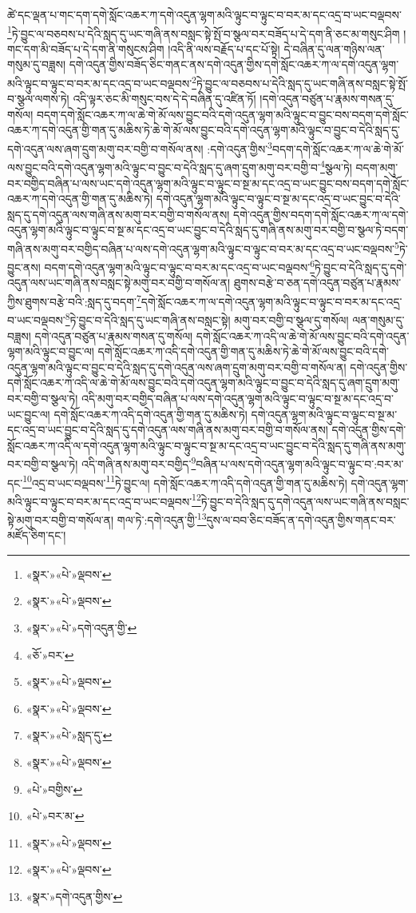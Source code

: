 ཚེ་དང་ལྡན་པ་གང་དག་དགེ་སློང་འཆར་ཀ་དགེ་འདུན་ལྷག་མའི་ལྟུང་བ་ལྟུང་བ་བར་མ་དང་འདྲ་བ་ཡང་བལྡབས་\footnote{«སྣར་»«པེ་»ལྡབས་}ཏེ་བྱུང་ལ་བཅབས་པ་དེའི་སླད་དུ་ཡང་གཞི་ནས་བསླང་སྟེ་སྤོ་བ་སྩལ་བར་བཟོད་པ་དེ་དག་ནི་ཅང་མ་གསུང་ཤིག །གང་དག་མི་བཟོད་པ་དེ་དག་ནི་གསུངས་ཤིག །འདི་ནི་ལས་བརྗོད་པ་དང་པོ་སྟེ། དེ་བཞིན་དུ་ལན་གཉིས་ལན་གསུམ་དུ་བཟླས། དགེ་འདུན་གྱིས་བཟོད་ཅིང་གནང་ནས་དགེ་འདུན་གྱིས་དགེ་སློང་འཆར་ཀ་ལ་དགེ་འདུན་ལྷག་མའི་ལྟུང་བ་ལྟུང་བ་བར་མ་དང་འདྲ་བ་ཡང་བལྡབས་\footnote{«སྣར་»«པེ་»ལྡབས་}ཏེ་བྱུང་ལ་བཅབས་པ་དེའི་སླད་དུ་ཡང་གཞི་ནས་བསླང་སྟེ་སྤོ་བ་སྩལ་ལགས་ཏེ། འདི་ལྟར་ཅང་མི་གསུང་བས་དེ་དེ་བཞིན་དུ་འཛིན་ཏོ། །དགེ་འདུན་བཙུན་པ་རྣམས་གསན་དུ་གསོལ། བདག་དགེ་སློང་འཆར་ཀ་ལ་ཆེ་གེ་མོ་ལས་བྱུང་བའི་དགེ་འདུན་ལྷག་མའི་ལྟུང་བ་བྱུང་བས་བདག་དགེ་སློང་འཆར་ཀ་དགེ་འདུན་གྱི་གན་དུ་མཆིས་ཏེ་ཆེ་གེ་མོ་ལས་བྱུང་བའི་དགེ་འདུན་ལྷག་མའི་ལྟུང་བ་བྱུང་བ་དེའི་སླད་དུ་དགེ་འདུན་ལས་ཞག་དྲུག་མགུ་བར་བགྱི་བ་གསོལ་ནས། :དགེ་འདུན་གྱིས་\footnote{«སྣར་»«པེ་»དགེ་འདུན་གྱི་}བདག་དགེ་སློང་འཆར་ཀ་ལ་ཆེ་གེ་མོ་ལས་བྱུང་བའི་དགེ་འདུན་ལྷག་མའི་ལྟུང་བ་བྱུང་བ་དེའི་སླད་དུ་ཞག་དྲུག་མགུ་བར་བགྱི་བ་\footnote{«ཅོ་»བར་}སྩལ་ཏེ། བདག་མགུ་བར་བགྱིད་བཞིན་པ་ལས་ཡང་དགེ་འདུན་ལྷག་མའི་ལྟུང་བ་ལྟུང་བ་སྔ་མ་དང་འདྲ་བ་ཡང་བྱུང་བས་བདག་དགེ་སློང་འཆར་ཀ་དགེ་འདུན་གྱི་གན་དུ་མཆིས་ཏེ། དགེ་འདུན་ལྷག་མའི་ལྟུང་བ་ལྟུང་བ་སྔ་མ་དང་འདྲ་བ་ཡང་བྱུང་བ་དེའི་སླད་དུ་དགེ་འདུན་ལས་གཞི་ནས་མགུ་བར་བགྱི་བ་གསོལ་ནས། དགེ་འདུན་གྱིས་བདག་དགེ་སློང་འཆར་ཀ་ལ་དགེ་འདུན་ལྷག་མའི་ལྟུང་བ་ལྟུང་བ་སྔ་མ་དང་འདྲ་བ་ཡང་བྱུང་བ་དེའི་སླད་དུ་གཞི་ནས་མགུ་བར་བགྱི་བ་སྩལ་ཏེ་བདག་གཞི་ནས་མགུ་བར་བགྱིད་བཞིན་པ་ལས་དགེ་འདུན་ལྷག་མའི་ལྟུང་བ་ལྟུང་བ་བར་མ་དང་འདྲ་བ་ཡང་བལྡབས་\footnote{«སྣར་»«པེ་»ལྡབས་}ཏེ་བྱུང་ནས། བདག་དགེ་འདུན་ལྷག་མའི་ལྟུང་བ་ལྟུང་བ་བར་མ་དང་འདྲ་བ་ཡང་བལྡབས་\footnote{«སྣར་»«པེ་»ལྡབས་}ཏེ་བྱུང་བ་དེའི་སླད་དུ་དགེ་འདུན་ལས་ཡང་གཞི་ནས་བསླང་སྟེ་མགུ་བར་བགྱི་བ་གསོལ་ན། ཐུགས་བརྩེ་བ་ཅན་དགེ་འདུན་བཙུན་པ་རྣམས་ཀྱིས་ཐུགས་བརྩེ་བའི་:སླད་དུ་བདག་\footnote{«སྣར་»«པེ་»སླད་དུ་}དགེ་སློང་འཆར་ཀ་ལ་དགེ་འདུན་ལྷག་མའི་ལྟུང་བ་ལྟུང་བ་བར་མ་དང་འདྲ་བ་ཡང་བལྡབས་\footnote{«སྣར་»«པེ་»ལྡབས་}ཏེ་བྱུང་བ་དེའི་སླད་དུ་ཡང་གཞི་ནས་བསླང་སྟེ། མགུ་བར་བགྱི་བ་སྩལ་དུ་གསོལ། ལན་གསུམ་དུ་བཟླས། དགེ་འདུན་བཙུན་པ་རྣམས་གསན་དུ་གསོལ། དགེ་སློང་འཆར་ཀ་འདི་ལ་ཆེ་གེ་མོ་ལས་བྱུང་བའི་དགེ་འདུན་ལྷག་མའི་ལྟུང་བ་བྱུང་ལ། དགེ་སློང་འཆར་ཀ་འདི་དགེ་འདུན་གྱི་གན་དུ་མཆིས་ཏེ་ཆེ་གེ་མོ་ལས་བྱུང་བའི་དགེ་འདུན་ལྷག་མའི་ལྟུང་བ་བྱུང་བ་དེའི་སླད་དུ་དགེ་འདུན་ལས་ཞག་དྲུག་མགུ་བར་བགྱི་བ་གསོལ་ན། དགེ་འདུན་གྱིས་དགེ་སློང་འཆར་ཀ་འདི་ལ་ཆེ་གེ་མོ་ལས་བྱུང་བའི་དགེ་འདུན་ལྷག་མའི་ལྟུང་བ་བྱུང་བ་དེའི་སླད་དུ་ཞག་དྲུག་མགུ་བར་བགྱི་བ་སྩལ་ཏེ། འདི་མགུ་བར་བགྱིད་བཞིན་པ་ལས་དགེ་འདུན་ལྷག་མའི་ལྟུང་བ་ལྟུང་བ་སྔ་མ་དང་འདྲ་བ་ཡང་བྱུང་ལ། དགེ་སློང་འཆར་ཀ་འདི་དགེ་འདུན་གྱི་གན་དུ་མཆིས་ཏེ། དགེ་འདུན་ལྷག་མའི་ལྟུང་བ་ལྟུང་བ་སྔ་མ་དང་འདྲ་བ་ཡང་བྱུང་བ་དེའི་སླད་དུ་དགེ་འདུན་ལས་གཞི་ནས་མགུ་བར་བགྱི་བ་གསོལ་ནས། དགེ་འདུན་གྱིས་དགེ་སློང་འཆར་ཀ་འདི་ལ་དགེ་འདུན་ལྷག་མའི་ལྟུང་བ་ལྟུང་བ་སྔ་མ་དང་འདྲ་བ་ཡང་བྱུང་བ་དེའི་སླད་དུ་གཞི་ནས་མགུ་བར་བགྱི་བ་སྩལ་ཏེ། འདི་གཞི་ནས་མགུ་བར་བགྱིད་\footnote{«པེ་»བགྱིས་}བཞིན་པ་ལས་དགེ་འདུན་ལྷག་མའི་ལྟུང་བ་ལྟུང་བ་:བར་མ་དང་\footnote{«པེ་»བར་མ་}འདྲ་བ་ཡང་བལྡབས་\footnote{«སྣར་»«པེ་»ལྡབས་}ཏེ་བྱུང་ལ། དགེ་སློང་འཆར་ཀ་འདི་དགེ་འདུན་གྱི་གན་དུ་མཆིས་ཏེ། དགེ་འདུན་ལྷག་མའི་ལྟུང་བ་ལྟུང་བ་བར་མ་དང་འདྲ་བ་ཡང་བལྡབས་\footnote{«སྣར་»«པེ་»ལྡབས་}ཏེ་བྱུང་བ་དེའི་སླད་དུ་དགེ་འདུན་ལས་ཡང་གཞི་ནས་བསླང་སྟེ་མགུ་བར་བགྱི་བ་གསོལ་ན། གལ་ཏེ་:དགེ་འདུན་གྱི་\footnote{«སྣར་»དགེ་འདུན་གྱིས་}དུས་ལ་བབ་ཅིང་བཟོད་ན་དགེ་འདུན་གྱིས་གནང་བར་མཛོད་ཅིག་དང་། 